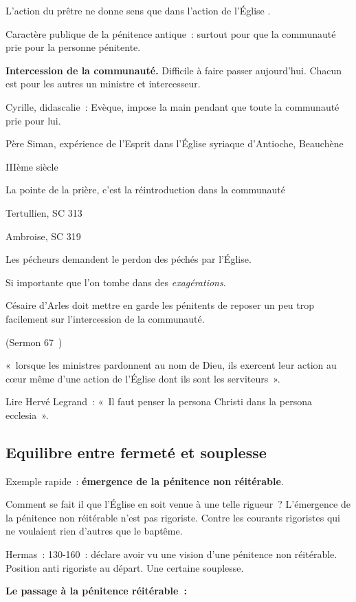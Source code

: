 L'action du prêtre ne donne sens que dans l'action de l'Église .

Caractère publique de la pénitence antique~: surtout pour que la
communauté prie pour la personne pénitente.

\textbf{Intercession de la communauté.} Difficile à faire passer
aujourd'hui. Chacun est pour les autres un ministre et intercesseur.

Cyrille, didascalie~: Evèque, impose la main pendant que toute la
communauté prie pour lui.

Père Siman, expérience de l'Esprit dans l'Église syriaque d'Antioche,
Beauchène

IIIème siècle

La pointe de la prière, c'est la réintroduction dans la communauté

Tertullien, SC 313

Ambroise, SC 319

Les pécheurs demandent le perdon des péchés par l'Église.

Si importante que l'on tombe dans des \emph{exagérations}.

Césaire d'Arles doit mettre en garde les pénitents de reposer un peu
trop facilement sur l'intercession de la communauté.

(Sermon 67~)

 
    {«~lorsque les ministres pardonnent au
nom de Dieu, ils exercent leur action au cœur même d'une action de
l'Église dont ils sont les
serviteurs~».}
 

Lire Hervé Legrand~: «~Il faut penser la persona Christi dans la persona
ecclesia~».

 
\subsection{Equilibre entre fermeté et
souplesse} 

Exemple rapide~: \textbf{émergence de la pénitence non réitérable}.

Comment se fait il que l'Église en soit venue à une telle rigueur~?
L'émergence de la pénitence non réitérable n'est pas rigoriste. Contre
les courants rigoristes qui ne voulaient rien d'autres que le baptême.

Hermas~: 130-160~: déclare avoir vu une vision d'une pénitence non
réitérable. Position anti rigoriste au départ. Une certaine souplesse.

\textbf{Le passage à la pénitence réitérable~:}

